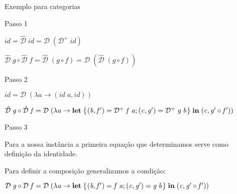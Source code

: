 \documentclass{beamer}
\theoremstyle{definition}
\theoremstyle{definition}
\theoremstyle{theorem}
\newcommand{\Varid}[1]{\mathit{#1}}
\begin{document}
\begin{frame}{Exemplo para categorias}
\begin{block}{Passo 1}

\ensuremath{\Varid{id}\mathrel{=}\mathcal{\hat{D}}\;\Varid{id}\mathrel{=}\mathcal{D}\;(\mathcal{D}^{+}\;\Varid{id})}

\ensuremath{\mathcal{\hat{D}}\;\Varid{g}\mathbin{\circ}\mathcal{\hat{D}}\;\Varid{f}\mathrel{=}\mathcal{\hat{D}}\;(\Varid{g}\mathbin{\circ}\Varid{f})\mathrel{=}\mathcal{D}\;(\mathcal{\hat{D}}\;(\Varid{g}\mathbin{\circ}\Varid{f}))}

\end{block}

\pause

\begin{block}{Passo 2}

\ensuremath{\Varid{id}\mathrel{=}\mathcal{D}\;(\lambda \Varid{a}\rightarrow (\Varid{id}\;\Varid{a},\Varid{id}))}

\ensuremath{\mathcal{\hat{D}}\;\Varid{g}\mathbin{\circ}\mathcal{\hat{D}}\;\Varid{f}\mathrel{=}\mathcal{D}\;(\lambda \Varid{a}\rightarrow \mathbf{let}\;\{\mskip1.5mu (\Varid{b},\Varid{f'})\mathrel{=}\mathcal{D}^{+}\;\Varid{f}\;\Varid{a};(\Varid{c},\Varid{g'})\mathrel{=}\mathcal{D}^{+}\;\Varid{g}\;\Varid{b}\mskip1.5mu\}\;\mathbf{in}\;(\Varid{c},\Varid{g'}\mathbin{\circ}\Varid{f'}))}

\end{block}

\pause

\begin{block}{Passo 3}

Para a nossa instância a primeira equação que determinamos serve como definição da identidade.

Para definir a composição generalizamos a condição:

\ensuremath{\mathcal{D}\;\Varid{g}\mathbin{\circ}\mathcal{D}\;\Varid{f}\mathrel{=}\mathcal{D}\;(\lambda \Varid{a}\rightarrow \mathbf{let}\;\{\mskip1.5mu (\Varid{b},\Varid{f'})\mathrel{=}\Varid{f}\;\Varid{a};(\Varid{c},\Varid{g'})\mathrel{=}\Varid{g}\;\Varid{b}\mskip1.5mu\}\;\mathbf{in}\;(\Varid{c},\Varid{g'}\mathbin{\circ}\Varid{f'}))}

\end{block}
\end{frame}
\end{document}
